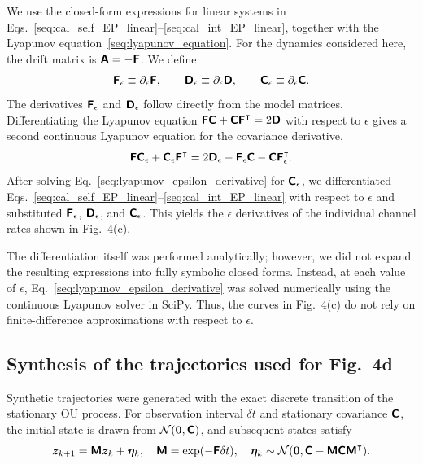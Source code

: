 We use the closed-form expressions for linear systems in Eqs.~\eqref{seq:cal_self_EP_linear}--\eqref{seq:cal_int_EP_linear}, together with the Lyapunov equation~\eqref{seq:lyapunov_equation}. For the dynamics considered here, the drift matrix is $\boldsymbol{\mathsf{A}}=-\boldsymbol{\mathsf{F}}$. We define
\begin{equation}
    \boldsymbol{\mathsf{F}}_\epsilon \equiv \partial_\epsilon \boldsymbol{\mathsf{F}},
    \qquad
    \boldsymbol{\mathsf{D}}_\epsilon \equiv \partial_\epsilon \boldsymbol{\mathsf{D}},
    \qquad
    \boldsymbol{\mathsf{C}}_\epsilon \equiv \partial_\epsilon \boldsymbol{\mathsf{C}}.
\end{equation}
The derivatives $\boldsymbol{\mathsf{F}}_\epsilon$ and $\boldsymbol{\mathsf{D}}_\epsilon$ follow directly from the model matrices. Differentiating the Lyapunov equation $\boldsymbol{\mathsf{F}}\boldsymbol{\mathsf{C}}+\boldsymbol{\mathsf{C}}\boldsymbol{\mathsf{F}}^\intercal=2\boldsymbol{\mathsf{D}}$ with respect to $\epsilon$ gives a second continuous Lyapunov equation for the covariance derivative,
\begin{equation}
    \boldsymbol{\mathsf{F}}\boldsymbol{\mathsf{C}}_\epsilon
    +\boldsymbol{\mathsf{C}}_\epsilon\boldsymbol{\mathsf{F}}^\intercal
    =
    2\boldsymbol{\mathsf{D}}_\epsilon
    -\boldsymbol{\mathsf{F}}_\epsilon\boldsymbol{\mathsf{C}}
    -\boldsymbol{\mathsf{C}}\boldsymbol{\mathsf{F}}_\epsilon^\intercal.
    \label{seq:lyapunov_epsilon_derivative}
\end{equation}
After solving Eq.~\eqref{seq:lyapunov_epsilon_derivative} for $\boldsymbol{\mathsf{C}}_\epsilon$, we differentiated Eqs.~\eqref{seq:cal_self_EP_linear}--\eqref{seq:cal_int_EP_linear} with respect to $\epsilon$ and substituted $\boldsymbol{\mathsf{F}}_\epsilon$, $\boldsymbol{\mathsf{D}}_\epsilon$, and $\boldsymbol{\mathsf{C}}_\epsilon$. This yields the $\epsilon$ derivatives of the individual channel rates shown in Fig.~4(c).

The differentiation itself was performed analytically; however, we did not expand the resulting expressions into fully symbolic closed forms. Instead, at each value of $\epsilon$, Eq.~\eqref{seq:lyapunov_epsilon_derivative} was solved numerically using the continuous Lyapunov solver in SciPy. Thus, the curves in Fig.~4(c) do not rely on finite-difference approximations with respect to $\epsilon$.

\subsection{Synthesis of the trajectories used for Fig.~4d}
\vspace*{-0.6\baselineskip}

Synthetic trajectories were generated with the exact discrete transition of the stationary OU process. For observation interval $\delta t$ and stationary covariance $\boldsymbol{\mathsf{C}}$, the initial state is drawn from $\mathcal N(\bm 0,\boldsymbol{\mathsf{C}})$, and subsequent states satisfy
\begin{equation}
    \bm z_{k+1}=\boldsymbol{\mathsf{M}}\bm z_k+\bm\eta_k,
    \quad
    \boldsymbol{\mathsf{M}}=\exp(-\boldsymbol{\mathsf{F}}\delta t),
    \quad
    \bm\eta_k\sim\mathcal N(\bm 0,\boldsymbol{\mathsf{C}}-\boldsymbol{\mathsf{M}}\boldsymbol{\mathsf{C}}\boldsymbol{\mathsf{M}}^\intercal).
    \label{seq:synthesis_trjs_equation}
\end{equation}

